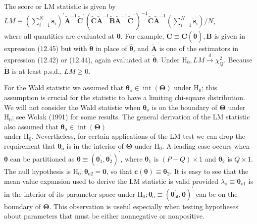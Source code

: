 \documentclass[10pt]{article}
\begin{document}
The score or LM statistic is given by\\
$L M \equiv\left(\sum_{i=1}^{N} \tilde{\mathbf{s}}_{i}\right)^{\prime} \tilde{\mathbf{A}}^{-1} \tilde{\mathbf{C}}^{\prime}\left(\tilde{\mathbf{C}} \tilde{\mathbf{A}}^{-1} \tilde{\mathbf{B}} \tilde{\mathbf{A}}^{-1} \tilde{\mathbf{C}}^{\prime}\right)^{-1} \tilde{\mathbf{C}} \tilde{\mathbf{A}}^{-1}\left(\sum_{i=1}^{N} \tilde{\mathbf{s}}_{i}\right) / N$,\\
where all quantities are evaluated at $\tilde{\boldsymbol{\theta}}$. For example, $\tilde{\mathbf{C}} \equiv \mathbf{C}(\tilde{\boldsymbol{\theta}}), \tilde{\mathbf{B}}$ is given in expression (12.45) but with $\tilde{\boldsymbol{\theta}}$ in place of $\hat{\boldsymbol{\theta}}$, and $\tilde{\mathbf{A}}$ is one of the estimators in expression (12.42) or (12.44), again evaluated at $\tilde{\boldsymbol{\theta}}$. Under $\mathrm{H}_{0}, L M \xrightarrow{d} \chi_{Q}^{2}$. Because $\tilde{\mathbf{B}}$ is at least p.s.d., $L M \geq 0$.

For the Wald statistic we assumed that $\boldsymbol{\theta}_{\mathrm{o}} \in \operatorname{int}(\boldsymbol{\Theta})$ under $\mathrm{H}_{0}$; this assumption is crucial for the statistic to have a limiting chi-square distribution. We will not consider the Wald statistic when $\boldsymbol{\theta}_{\mathrm{o}}$ is on the boundary of $\boldsymbol{\Theta}$ under $\mathrm{H}_{0}$; see Wolak (1991) for some results. The general derivation of the LM statistic also assumed that $\boldsymbol{\theta}_{\mathrm{o}} \in \operatorname{int}(\boldsymbol{\Theta})$\\
under $\mathrm{H}_{0}$. Nevertheless, for certain applications of the LM test we can drop the requirement that $\boldsymbol{\theta}_{\mathrm{o}}$ is in the interior of $\boldsymbol{\Theta}$ under $\mathrm{H}_{0}$. A leading case occurs when $\boldsymbol{\theta}$ can be partitioned as $\boldsymbol{\theta} \equiv\left(\boldsymbol{\theta}_{1}^{\prime}, \boldsymbol{\theta}_{2}^{\prime}\right)^{\prime}$, where $\boldsymbol{\theta}_{1}$ is $(P-Q) \times 1$ and $\boldsymbol{\theta}_{2}$ is $Q \times 1$. The null hypothesis is $\mathrm{H}_{0}: \boldsymbol{\theta}_{\mathrm{o} 2}=\mathbf{0}$, so that $\mathbf{c}(\boldsymbol{\theta}) \equiv \boldsymbol{\theta}_{2}$. It is easy to see that the mean value expansion used to derive the LM statistic is valid provided $\lambda_{\mathrm{o}} \equiv \boldsymbol{\theta}_{\mathrm{o} 1}$ is in the interior of its parameter space under $\mathrm{H}_{0} ; \boldsymbol{\theta}_{\mathrm{o}} \equiv\left(\boldsymbol{\theta}_{\mathrm{ol}}^{\prime}, \mathbf{0}\right)^{\prime}$ can be on the boundary of $\boldsymbol{\Theta}$. This observation is useful especially when testing hypotheses about parameters that must be either nonnegative or nonpositive.
\end{document}
